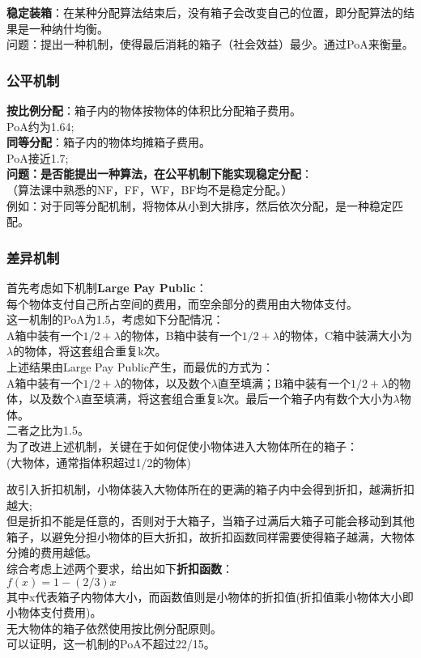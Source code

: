 \documentclass[11pt]{ctexart}
\begin{document}
\textbf{稳定装箱}：在某种分配算法结束后，没有箱子会改变自己的位置，即分配算法的结果是一种纳什均衡。\\

问题：提出一种机制，使得最后消耗的箱子（社会效益）最少。通过PoA来衡量。

\subsubsection{公平机制}
\textbf{按比例分配}：箱子内的物体按物体的体积比分配箱子费用。\\
PoA约为1.64;\\
\textbf{同等分配}：箱子内的物体均摊箱子费用。\\
PoA接近1.7;\\

\textbf{问题：是否能提出一种算法，在公平机制下能实现稳定分配}：\\
（算法课中熟悉的NF，FF，WF，BF均不是稳定分配。）\\
例如：对于同等分配机制，将物体从小到大排序，然后依次分配，是一种稳定匹配。\\


\subsubsection{差异机制}
首先考虑如下机制\textbf{Large Pay Public}：\\
每个物体支付自己所占空间的费用，而空余部分的费用由大物体支付。\\

这一机制的PoA为1.5，考虑如下分配情况：\\

A箱中装有一个$1/2+\lambda$的物体，B箱中装有一个$1/2+\lambda$的物体，C箱中装满大小为$\lambda$的物体，将这套组合重复k次。\\

上述结果由Large Pay Public产生，而最优的方式为：\\
A箱中装有一个$1/2+\lambda$的物体，以及数个$\lambda$直至填满；B箱中装有一个$1/2+\lambda$的物体，以及数个$\lambda$直至填满，将这套组合重复k次。最后一个箱子内有数个大小为$\lambda$物体。\\

二者之比为1.5。\\

为了改进上述机制，关键在于如何促使小物体进入大物体所在的箱子：\\
(大物体，通常指体积超过1/2的物体)

故引入折扣机制，小物体装入大物体所在的更满的箱子内中会得到折扣，越满折扣越大;\\

但是折扣不能是任意的，否则对于大箱子，当箱子过满后大箱子可能会移动到其他箱子，以避免分担小物体的巨大折扣，故折扣函数同样需要使得箱子越满，大物体分摊的费用越低。\\

综合考虑上述两个要求，给出如下\textbf{折扣函数}：\\
$f(x)=1-(2/3)x$\\
其中x代表箱子内物体大小，而函数值则是小物体的折扣值(折扣值乘小物体大小即小物体支付费用)。\\

无大物体的箱子依然使用按比例分配原则。\\

可以证明，这一机制的PoA不超过22/15。
\end{document}
